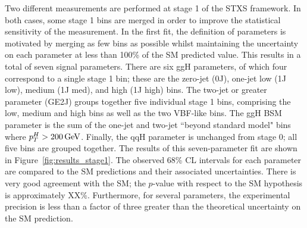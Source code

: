 Two different measurements are performed at stage 1 of the STXS framework.
In both cases, some stage 1 bins are merged 
in order to improve the statistical sensitivity of the measurement.
In the first fit, the definition of parameters is motivated by merging as few bins as possible
whilst maintaining the uncertainty on each parameter at less than 100\% of the SM predicted value.
This results in a total of seven signal parameters.
There are six ggH parameters, of which four correspond to a single stage 1 bin;
these are the zero-jet (0J), one-jet low (1J low), medium (1J med), and high (1J high) \ptH bins.
The two-jet or greater parameter (GE2J) groups together five individual stage 1 bins, 
comprising the low, medium and high \ptH bins as well as the two VBF-like bins.
The ggH BSM parameter is the sum of the one-jet and two-jet ``beyond standard model" bins
where $p_T^H > \SI{200}{GeV}$.
Finally, the qqH parameter is unchanged from stage 0;
all five bins are grouped together.
The results of this seven-parameter fit are shown in Figure~\ref{fig:results_stage1}. 
The observed 68\% CL intervals for each parameter are compared 
to the SM predictions and their associated uncertainties.
There is very good agreement with the SM; 
the $p$-value with respect to the SM hypothesis is approximately XX\%. %
Furthermore, for several parameters, the experimental precision is less than a factor of three 
greater than the theoretical uncertainty on the SM prediction. %

